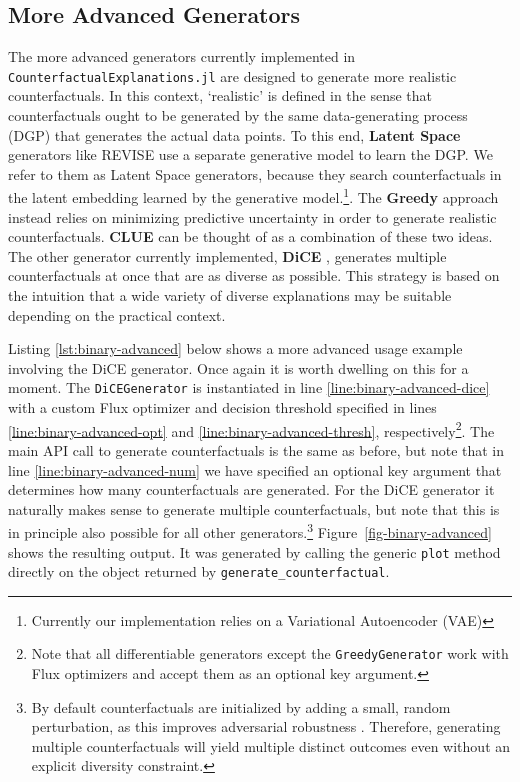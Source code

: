 \documentclass{juliacon}
\begin{document}
\hypertarget{more-advanced-generators}{%
\subsection{More Advanced Generators}\label{more-advanced-generators}}

The more advanced generators currently implemented in
\texttt{CounterfactualExplanations.jl} are designed to generate more
realistic counterfactuals. In this context, `realistic' is defined in
the sense that counterfactuals ought to be generated by the same
data-generating process (DGP) that generates the actual data points. To
this end, \textbf{Latent Space} generators like REVISE
\cite{joshi2019realistic} use a separate generative model to learn the
DGP. We refer to them as Latent Space generators, because they search
counterfactuals in the latent embedding learned by the generative
model.\footnote{Currently our implementation relies on a Variational
  Autoencoder (VAE)}. The \textbf{Greedy} approach
\cite{schut2021generating} instead relies on minimizing predictive
uncertainty in order to generate realistic counterfactuals.
\textbf{CLUE} \cite{antoran2020getting} can be thought of as a
combination of these two ideas. The other generator currently
implemented, \textbf{DiCE} \cite{mothilal2020explaining}, generates
multiple counterfactuals at once that are as diverse as possible. This
strategy is based on the intuition that a wide variety of diverse
explanations may be suitable depending on the practical context.

Listing \ref{lst:binary-advanced} below shows a more advanced usage
example involving the DiCE generator. Once again it is worth dwelling on
this for a moment. The \texttt{DiCEGenerator} is instantiated in line
\ref{line:binary-advanced-dice} with a custom Flux optimizer and
decision threshold specified in lines \ref{line:binary-advanced-opt} and
\ref{line:binary-advanced-thresh}, respectively\footnote{Note that all
  differentiable generators except the \texttt{GreedyGenerator} work
  with Flux optimizers and accept them as an optional key argument.}.
The main API call to generate counterfactuals is the same as before, but
note that in line \ref{line:binary-advanced-num} we have specified an
optional key argument that determines how many counterfactuals are
generated. For the DiCE generator it naturally makes sense to generate
multiple counterfactuals, but note that this is in principle also
possible for all other generators.\footnote{By default counterfactuals
  are initialized by adding a small, random perturbation, as this
  improves adversarial robustness \cite{slack2021counterfactual}.
  Therefore, generating multiple counterfactuals will yield multiple
  distinct outcomes even without an explicit diversity constraint.}
Figure~\ref{fig-binary-advanced} shows the resulting output. It was
generated by calling the generic \texttt{plot} method directly on the
object returned by \texttt{generate\_counterfactual}.
\end{document}
